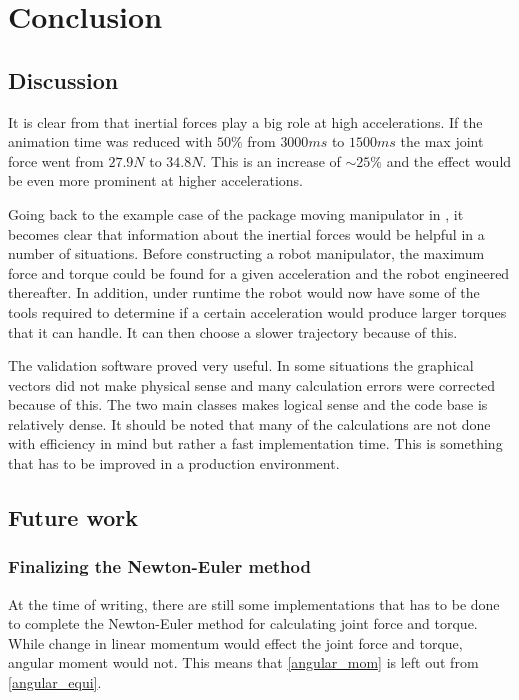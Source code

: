 \chapter{Conclusion}

\section{Discussion}

It is clear from  that inertial forces play a big role at high accelerations. If the animation time was reduced with $50\%$ from $3000ms$ to $1500ms$ the max joint force went from $27.9N$ to $34.8N$. This is an increase of $\sim 25\%$ and the effect would be even more prominent at higher accelerations.

Going back to the example case of the package moving manipulator in , it becomes clear that information about the inertial forces would be helpful in a number of situations. Before constructing a robot manipulator, the maximum force and torque could be found for a given acceleration and the robot engineered thereafter. In addition, under runtime the robot would now have some of the tools required to determine if a certain acceleration would produce larger torques that it can handle. It can then choose a slower trajectory because of this.

The validation software proved very useful. In some situations the graphical vectors did not make physical sense and many calculation errors were corrected because of this. The two main classes makes logical sense and the code base is relatively dense. It should be noted that many of the calculations are not done with efficiency in mind but rather a fast implementation time. This is something that has to be improved in a production environment.

\section{Future work}

\subsection{Finalizing the Newton-Euler method}
At the time of writing, there are still some implementations that has to be done to complete the Newton-Euler method for calculating joint force and torque. While change in linear momentum would effect the joint force and torque, angular moment would not. This means that \eqref{angular_mom} is left out from \eqref{angular_equi}.

